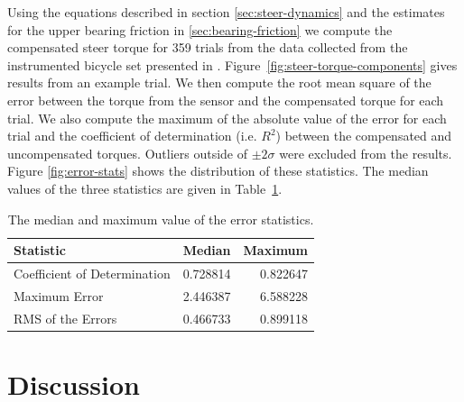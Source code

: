 \documentclass[a4paper]{article}
\begin{document}
Using the equations described in section \ref{sec:steer-dynamics} and the
estimates for the upper bearing friction in \ref{sec:bearing-friction} we
compute the compensated steer torque for 359 trials from the data collected
from the instrumented bicycle set presented in \cite{Moore2012}.
Figure~\ref{fig:steer-torque-components} gives results from an example trial.
We then compute the root mean square of the error between the torque from the
sensor and the compensated torque for each trial. We also compute the maximum
of the absolute value of the error for each trial and the coefficient of
determination (i.e. $R^2$) between the compensated and uncompensated torques.
Outliers outside of $\pm2 \sigma$ were excluded from the results. Figure
\ref{fig:error-stats} shows the distribution of these statistics. The median
values of the three statistics are given in Table~\ref{tab:medians}.

\begin{table}
  \caption{The median and maximum value of the error statistics.}
  \centering
  \begin{tabular}{lrr}
    \hline
    Statistic                    & Median   & Maximum \\
    \hline
    Coefficient of Determination & 0.728814 & 0.822647 \\
    Maximum Error                & 2.446387 & 6.588228 \\
    RMS of the Errors            & 0.466733 & 0.899118
  \end{tabular}
  \label{tab:medians}
\end{table}

\section*{Discussion}
\end{document}
